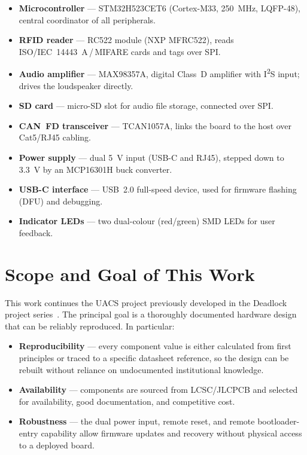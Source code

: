 \begin{itemize}
  \item \textbf{Microcontroller} --- STM32H523CET6 (Cortex-M33, \SI{250}{\mega\hertz},
        LQFP-48), central coordinator of all peripherals.
  \item \textbf{RFID reader} --- RC522 module (NXP MFRC522), reads ISO/IEC~14443~A\,/\,MIFARE
        cards and tags over SPI.
  \item \textbf{Audio amplifier} --- MAX98357A, digital Class~D amplifier with
        I\textsuperscript{2}S input; drives the loudspeaker directly.
  \item \textbf{SD card} --- micro-SD slot for audio file storage, connected over SPI.
  \item \textbf{CAN~FD transceiver} --- TCAN1057A, links the board to the host over
        Cat5/RJ45 cabling.
  \item \textbf{Power supply} --- dual \SI{5}{\volt} input (USB-C and RJ45), stepped down
        to \SI{3.3}{\volt} by an MCP16301H buck converter.
  \item \textbf{USB-C interface} --- USB~2.0 full-speed device, used for firmware
        flashing (DFU) and debugging.
  \item \textbf{Indicator LEDs} --- two dual-colour (red/green) SMD LEDs for user
        feedback.
\end{itemize}

\section*{Scope and Goal of This Work}

This work continues the UACS project previously developed in the Deadlock project
series~\cite{refpredecessor}. The principal goal is a thoroughly documented hardware
design that can be reliably reproduced. In particular:

\begin{itemize}
  \item \textbf{Reproducibility} --- every component value is either calculated from
        first principles or traced to a specific datasheet reference, so the design can
        be rebuilt without reliance on undocumented institutional knowledge.
  \item \textbf{Availability} --- components are sourced from LCSC/JLCPCB and selected
        for availability, good documentation, and competitive cost.
  \item \textbf{Robustness} --- the dual power input, remote reset, and remote
        bootloader-entry capability allow firmware updates and recovery without physical
        access to a deployed board.
\end{itemize}
